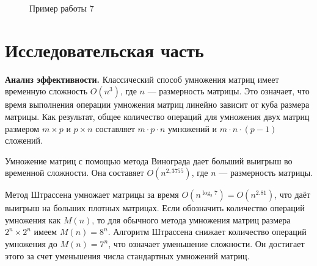 \documentclass[12pt, a4paper]{article}
\begin{document}
\begin{enumerate}
\begin{figure}[h]
  		\caption{Пример работы 7}
  		\label{img:grap7}
	\end{figure}
\end{enumerate}
\newpage
\section{Исследовательская часть}
\textbf {Анализ эффективности.}
Классический способ умножения матриц имеет временную сложность $O(n^3)$, где 
$n$ --- размерность матрицы. Это означает, что время выполнения операции 
умножения матриц линейно зависит от куба размера матрицы. Как результат, общее 
количество операций для умножения двух матриц размером $m \times p$ и $p \times 
n$ составляет $m \cdot p \cdot n$ умножений и $m \cdot n \cdot (p - 1)$ 
сложений.

Умножение матриц с помощью метода Винограда дает больший выигрыш во временной 
сложности. Она составяет $O(n^{2,3755})$, где $n$ --- размерность матрицы. 

Метод Штрассена умножает матрицы за время  $O(n^{\log _{2}7})=O(n^{2.81})$, что даёт выигрыш на больших плотных матрицах. Если обозначить количество операций умножения как $M(n)$, то для обычного метода умножения матриц размера $2^n \times 2^n$ имеем $M(n) = 8^n$. Алгоритм Штрассена снижает количество операций умножения до $M(n) = 7^n$, что означает уменьшение сложности. Он достигает этого за счет уменьшения числа стандартных умножений матриц.
\end{document}
